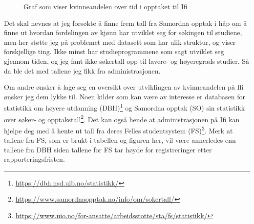 \begin{figure}
	\caption{Graf som viser kvinneandelen over tid i opptaket til Ifi}
	\label{figure:kvinneandel}
\end{figure}

Det skal nevnes at jeg forsøkte å finne frem tall fra Samordna opptak i håp om å finne ut hvordan fordelingen av kjønn har utviklet seg for søkingen til studiene, men her støtte jeg på problemet med datasett som har ulik struktur, og viser forskjellige ting. Ikke minst har studieprogrammene som sagt utviklet seg gjennom tiden, og jeg fant ikke søkertall opp til lavere- og høyeregrads studier. Så da ble det med tallene jeg fikk fra administrasjonen.

Om andre ønsker å lage seg en oversikt over utviklingen av kvinneandelen på Ifi ønsker jeg dem lykke til. Noen kilder som kan være av interesse er databasen for statistikk om høyere utdanning (DBH)\footnote{\url{https://dbh.nsd.uib.no/statistikk/}} og Samordna opptak (SO) sin statistikk over søker- og opptakstall\footnote{\url{https://www.samordnaopptak.no/info/om/sokertall/}}. Det kan også hende at administrasjonen på Ifi kan hjelpe deg med å hente ut tall fra deres Felles studentsystem (FS)\footnote{\url{https://www.uio.no/for-ansatte/arbeidsstotte/sta/fs/statistikk/}}. Merk at tallene fra FS, som er brukt i tabellen og figuren her, vil være annerledes enn tallene fra DBH siden tallene for FS tar høyde for registreringer etter rapporteringsfristen.